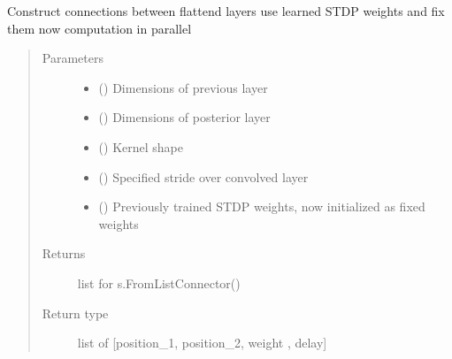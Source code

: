 \documentclass[letterpaper,10pt,english]{sphinxmanual}
\begin{document}
\begin{fulllineitems}
\label{\detokenize{SpikingConvNet:SpikingConvNet.algorithms.rebuild_fixed_connections}}
Construct connections between flattend layers
use learned STDP weights and fix them
now computation in parallel
\begin{quote}\begin{description}
\item[{Parameters}] \leavevmode\begin{itemize}
\item {} 
 () \textendash{} Dimensions of previous layer

\item {} 
 () \textendash{} Dimensions of posterior layer

\item {} 
 () \textendash{} Kernel shape

\item {} 
 () \textendash{} Specified stride over convolved layer

\item {} 
 () \textendash{} Previously trained STDP weights, now initialized as fixed weights

\end{itemize}

\item[{Returns}] \leavevmode
{} \textendash{} list for s.FromListConnector()

\item[{Return type}] \leavevmode
list of {[}position\_1, position\_2, weight , delay{]}

\end{description}\end{quote}

\end{fulllineitems}

\end{document}
